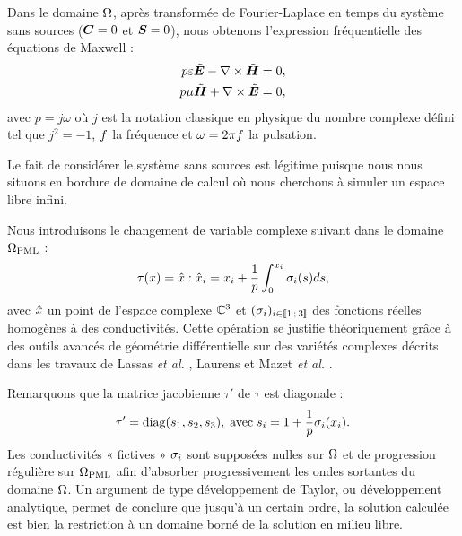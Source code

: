 Dans le domaine $\Omega$, après transformée de Fourier-Laplace en temps du système
sans sources ($\bm{C} = 0$ et $\bm{S} = 0$), nous obtenons
l'expression fréquentielle des équations de Maxwell :
\begin{subequations} \label{eq:maxwell_f}
	\begin{align}
		p \varepsilon \tilde{\bm{E}} - \nabla\times \tilde{\bm{H}} &= 0 , \\
		p \mu \tilde{\bm{H}} + \nabla\times \tilde{\bm{E}} &= 0 ,
	\end{align}
\end{subequations}
avec $p = j \omega$
où $j$ est la notation classique en physique du nombre complexe défini
tel que $j^2 = -1$, $f$ la fréquence et $\omega = 2 \pi f$ la pulsation.

\begin{remark}
	Le fait de considérer le système sans sources est légitime puisque nous nous situons
	en bordure de domaine de calcul où nous cherchons à simuler un espace libre infini.
\end{remark}


Nous introduisons le changement de variable complexe suivant
dans le domaine $\Omega_{\mathrm{PML}}$ :
\begin{align}
	\tau(x) = \hat{x} :
	\hat{x}_i = x_i
	+ \frac{1}{p} \int_{0}^{x_i}
	\sigma_i (s) ds
	\label{eq:pml_chgt_var} ,
\end{align}
avec $\hat{x}$ un point
de l'espace complexe $\mathbb{C}^{3}$ et $(\sigma_i)_{i \in \lbrack\!\lbrack1\,;\,3\rbrack\!\rbrack}$
des fonctions réelles homogènes à des conductivités.
Cette opération se justifie théoriquement grâce à des outils avancés
de géométrie différentielle sur des variétés complexes décrits
dans les travaux de Lassas \textit{et al.} \cite{LASSAS2001739},
Laurens \cite{laurens:tel-00475286} et
Mazet \textit{et al.} \cite{MAZET199859}.

Remarquons que la matrice jacobienne $\tau'$ de $\tau$ est diagonale :
\begin{align}
	\tau' = \mathrm{diag} (s_1, s_2, s_3) ,
	\; \mathrm{avec} \;
	s_i = 1 + \frac{1}{p} \sigma_i (x_i) .
\end{align}
Les conductivités « fictives » $\sigma_i$
sont supposées nulles sur $\Omega$ et de progression régulière sur
$\Omega_{\mathrm{PML}}$ afin d'absorber progressivement les ondes sortantes
du domaine $\Omega$.
Un argument de type développement de Taylor, ou développement analytique,
permet de conclure que jusqu’à un certain ordre, la solution calculée
est bien la restriction à un domaine borné de la solution en milieu libre.

